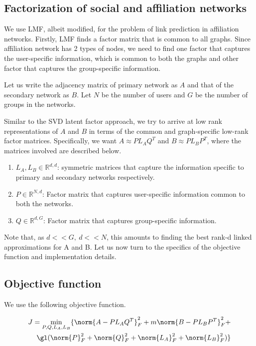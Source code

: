 \documentclass{report}
\begin{document}
\subsection{Factorization of social and affiliation networks}
We use LMF, albeit modified, for the problem of link prediction in affiliation networks. Firstly, LMF finds a factor matrix that is common to all graphs. Since affiliation network has 2 types of nodes, we need to find one factor that captures the user-specific information, which is common to both the graphs and other factor that captures the group-specific information.

Let us write the adjacency matrix of primary network as $A$ and that of the secondary network as $B$. Let $N$ be the number of users and $G$ be the number of groups in the networks.

Similar to the SVD latent factor approach, we try to arrive at low rank representations of $A$ and $B$ in terms of the common and graph-specific low-rank factor matrices. Specifically, we want $A \approx P L_A Q^T$ and $B \approx P L_B P^T$, where the matrices involved are described below.

\begin{enumerate}
 \item $L_A, L_B \in \mathbb{R}^{d,d}$: symmetric matrices that capture the information specific to primary and secondary networks respectively.
 \item $P \in \mathbb{R}^{N,d}$: Factor matrix that captures user-specific information common to both the networks.
 \item $Q \in \mathbb{R}^{d,G}$: Factor matrix that captures group-specific information.
\end{enumerate}

Note that, as $d << G,\ d<<N$, this amounts to finding the best rank-d linked approximations for A and B. Let us now turn to the specifics of the objective function and implementation details.

\subsection{Objective function}
We use the following objective function.

\begin{eqnarray*}
 J = \min_{P,Q,L_A,L_B} \{\norm{A - P L_A Q^{T}}_F^{2} + m\norm{B - P L_B P^{T}}_F^{2} +  \\
 \gl(\norm{P}_F^{2} + \norm{Q}_F^{2} + \norm{L_A}_F^{2} + \norm{L_B}_F^{2})\}
\end{eqnarray*}
\end{document}
